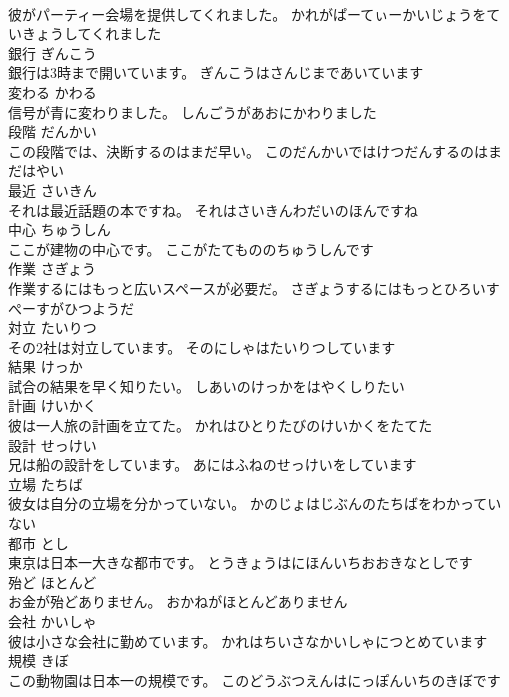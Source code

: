 \documentclass[8pt]{extreport}
\begin{document}
\begin{CJK}{UTF8}{min}
\\	彼がパーティー会場を提供してくれました。	かれがぱーてぃーかいじょうをていきょうしてくれました	
\\	銀行	ぎんこう	
\\	銀行は3時まで開いています。	ぎんこうはさんじまであいています	
\\	変わる	かわる	
\\	信号が青に変わりました。	しんごうがあおにかわりました	
\\	段階	だんかい	
\\	この段階では、決断するのはまだ早い。	このだんかいではけつだんするのはまだはやい	
\\	最近	さいきん	
\\	それは最近話題の本ですね。	それはさいきんわだいのほんですね	
\\	中心	ちゅうしん	
\\	ここが建物の中心です。	ここがたてもののちゅうしんです	
\\	作業	さぎょう	
\\	作業するにはもっと広いスペースが必要だ。	さぎょうするにはもっとひろいすぺーすがひつようだ	
\\	対立	たいりつ	
\\	その2社は対立しています。	そのにしゃはたいりつしています	
\\	結果	けっか	
\\	試合の結果を早く知りたい。	しあいのけっかをはやくしりたい	
\\	計画	けいかく	
\\	彼は一人旅の計画を立てた。	かれはひとりたびのけいかくをたてた	
\\	設計	せっけい	
\\	兄は船の設計をしています。	あにはふねのせっけいをしています	
\\	立場	たちば	
\\	彼女は自分の立場を分かっていない。	かのじょはじぶんのたちばをわかっていない	
\\	都市	とし	
\\	東京は日本一大きな都市です。	とうきょうはにほんいちおおきなとしです	
\\	殆ど	ほとんど	
\\	お金が殆どありません。	おかねがほとんどありません	
\\	会社	かいしゃ	
\\	彼は小さな会社に勤めています。	かれはちいさなかいしゃにつとめています	
\\	規模	きぼ	
\\	この動物園は日本一の規模です。	このどうぶつえんはにっぽんいちのきぼです	

\end{CJK}
\end{document}

